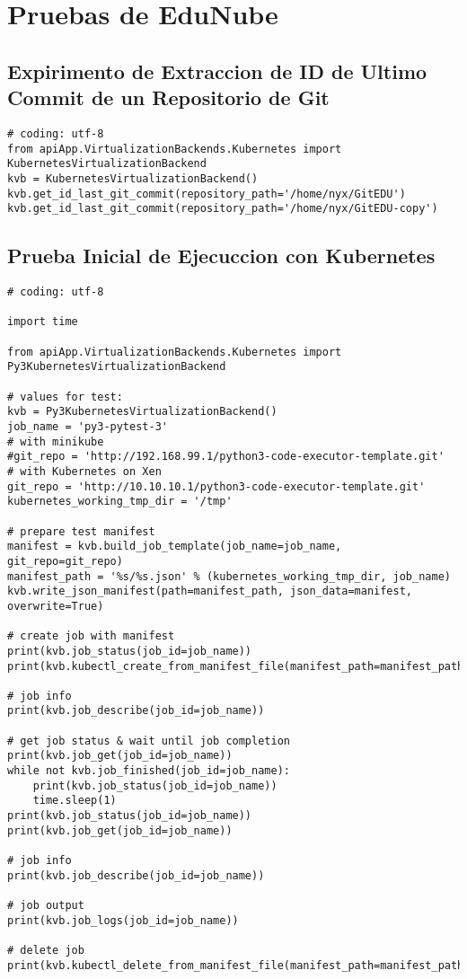 \lstset{language=Bash}

\chapter{Pruebas de EduNube}
\label{AnexoG}

\section{Expirimento de Extraccion de ID de Ultimo Commit de un Repositorio de Git}
\lstset{language=Python}
\begin{lstlisting}[breaklines]
# coding: utf-8
from apiApp.VirtualizationBackends.Kubernetes import KubernetesVirtualizationBackend
kvb = KubernetesVirtualizationBackend()
kvb.get_id_last_git_commit(repository_path='/home/nyx/GitEDU')
kvb.get_id_last_git_commit(repository_path='/home/nyx/GitEDU-copy')
\end{lstlisting}

\section{Prueba Inicial de Ejecuccion con Kubernetes}
\lstset{language=Python}
\begin{lstlisting}
# coding: utf-8

import time

from apiApp.VirtualizationBackends.Kubernetes import Py3KubernetesVirtualizationBackend

# values for test:
kvb = Py3KubernetesVirtualizationBackend()
job_name = 'py3-pytest-3'
# with minikube
#git_repo = 'http://192.168.99.1/python3-code-executor-template.git'
# with Kubernetes on Xen
git_repo = 'http://10.10.10.1/python3-code-executor-template.git'
kubernetes_working_tmp_dir = '/tmp'

# prepare test manifest
manifest = kvb.build_job_template(job_name=job_name, git_repo=git_repo)
manifest_path = '%s/%s.json' % (kubernetes_working_tmp_dir, job_name)
kvb.write_json_manifest(path=manifest_path, json_data=manifest, overwrite=True)

# create job with manifest
print(kvb.job_status(job_id=job_name))
print(kvb.kubectl_create_from_manifest_file(manifest_path=manifest_path))

# job info
print(kvb.job_describe(job_id=job_name))

# get job status & wait until job completion
print(kvb.job_get(job_id=job_name))
while not kvb.job_finished(job_id=job_name):
    print(kvb.job_status(job_id=job_name))
    time.sleep(1)
print(kvb.job_status(job_id=job_name))
print(kvb.job_get(job_id=job_name))

# job info
print(kvb.job_describe(job_id=job_name))

# job output
print(kvb.job_logs(job_id=job_name))

# delete job
print(kvb.kubectl_delete_from_manifest_file(manifest_path=manifest_path))
\end{lstlisting}
\lstset{language=Bash}

